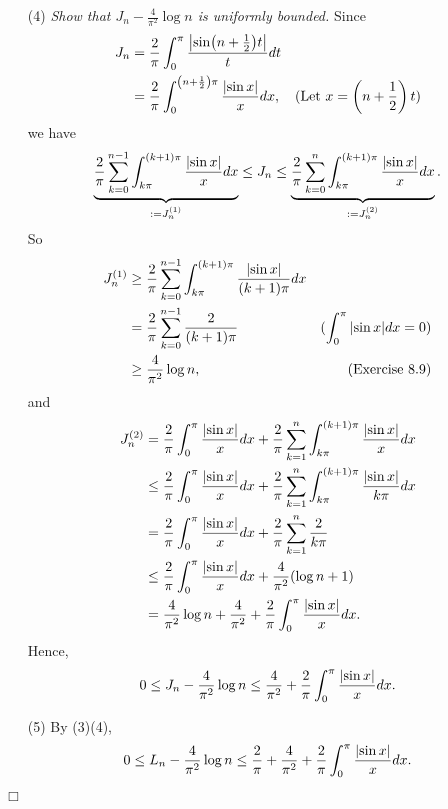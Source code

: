 \documentclass{article}
\begin{document}
\begin{enumerate}
\item[(4)]
\emph{Show that $J_n - \frac{4}{\pi^2}\log n$ is uniformly bounded.}
Since
\begin{align*}
  J_n
  &= \frac{2}{\pi} \int_{0}^{\pi} \frac{\abs{ \sin(n+\frac{1}{2})t }}{t} dt \\
  &= \frac{2}{\pi} \int_{0}^{\left( n+\frac{1}{2} \right)\pi}
      \frac{\abs{ \sin x }}{x} dx,
    &\text{(Let $x = \left( n+\frac{1}{2} \right) t$)}
\end{align*}
we have
\[
  \underbrace{ \frac{2}{\pi}
      \sum_{k=0}^{n-1} \int_{k\pi}^{(k+1)\pi}
      \frac{\abs{ \sin x }}{x} dx }_{:= J^{(1)}_n}
  \leq J_n
  \leq \underbrace{ \frac{2}{\pi}
      \sum_{k=0}^{n} \int_{k\pi}^{(k+1)\pi}
      \frac{\abs{ \sin x }}{x} dx }_{:= J^{(2)}_n}.
\]
So
\begin{align*}
  J^{(1)}_n
  &\geq
  \frac{2}{\pi} \sum_{k=0}^{n-1} \int_{k\pi}^{(k+1)\pi} \frac{\abs{ \sin x }}{(k+1)\pi} dx \\
  &=
  \frac{2}{\pi} \sum_{k=0}^{n-1} \frac{2}{(k+1)\pi}
    &(\int_{0}^{\pi}\abs{ \sin x } dx = 0) \\
  &\geq \frac{4}{\pi^2} \log n,
    &\text{(Exercise 8.9)}
\end{align*}
and
\begin{align*}
  J^{(2)}_n
  &=
  \frac{2}{\pi} \int_{0}^{\pi} \frac{\abs{ \sin x }}{x} dx
    + \frac{2}{\pi} \sum_{k=1}^{n} \int_{k\pi}^{(k+1)\pi} \frac{\abs{ \sin x }}{x} dx \\
  &\leq
  \frac{2}{\pi} \int_{0}^{\pi} \frac{\abs{ \sin x }}{x} dx
    + \frac{2}{\pi} \sum_{k=1}^{n} \int_{k\pi}^{(k+1)\pi} \frac{\abs{ \sin x }}{k\pi} dx \\
  &=
  \frac{2}{\pi} \int_{0}^{\pi} \frac{\abs{ \sin x }}{x} dx
    + \frac{2}{\pi} \sum_{k=1}^{n} \frac{2}{k\pi} \\
  &\leq
  \frac{2}{\pi} \int_{0}^{\pi} \frac{\abs{ \sin x }}{x} dx
    + \frac{4}{\pi^2} (\log n + 1) \\
  &=
  \frac{4}{\pi^2}\log n
    + \frac{4}{\pi^2}
    + \frac{2}{\pi} \int_{0}^{\pi} \frac{\abs{ \sin x }}{x} dx.
\end{align*}
Hence,
\[
  0
  \leq
  J_n - \frac{4}{\pi^2}\log n
  \leq
  \frac{4}{\pi^2} + \frac{2}{\pi} \int_{0}^{\pi} \frac{\abs{ \sin x }}{x} dx.
\]

\item[(5)]
By (3)(4),
\[
  0
  \leq
  L_n - \frac{4}{\pi^2}\log n
  \leq
  \frac{2}{\pi} + \frac{4}{\pi^2} + \frac{2}{\pi} \int_{0}^{\pi} \frac{\abs{ \sin x }}{x} dx.
\]
\end{enumerate}
$\Box$ \\\\
\end{document}
